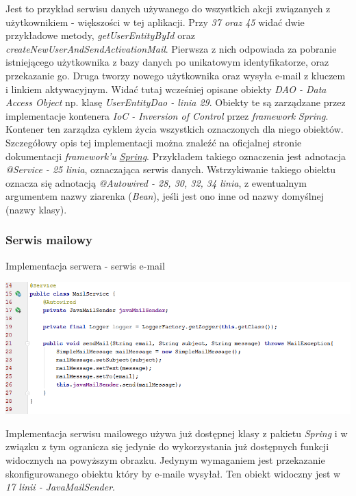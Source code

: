 \documentclass[10pt,titlepage]{article} %
\begin{document}
Jest to przykład serwisu danych używanego do wszystkich akcji związanych z użytkownikiem - większości w tej aplikacji. Przy \textit{37 oraz 45} widać dwie przykładowe metody, \textit{getUserEntityById} oraz \textit{createNewUserAndSendActivationMail}. Pierwsza z nich odpowiada za pobranie istniejącego użytkownika z bazy danych po unikatowym identyfikatorze, oraz przekazanie go. Druga tworzy nowego użytkownika oraz wysyła e-mail z kluczem i linkiem aktywacyjnym. Widać tutaj wcześniej opisane obiekty \textit{DAO - Data Access Object} np. klasę \textit{UserEntityDao - linia 29}. Obiekty te są zarządzane przez implementacje kontenera \textit{IoC - Inversion of Control} przez \textit{framework} \textit{Spring}. Kontener ten zarządza cyklem życia wszystkich oznaczonych dla niego obiektów. Szczegółowy opis tej implementacji można znaleźć na oficjalnej stronie dokumentacji \textit{framework'u} \href{https://docs.spring.io/spring/docs/current/spring-framework-reference/html/beans.html}{\textit{Spring}}\cite{ioc}. Przykładem takiego oznaczenia jest adnotacja \textit{@Service - 25 linia}, oznaczająca serwis danych. Wstrzykiwanie takiego obiektu oznacza się adnotacją \textit{@Autowired - 28, 30, 32, 34 linia}, z ewentualnym argumentem nazwy ziarenka (\textit{Bean}), jeśli jest ono inne od nazwy domyślnej (nazwy klasy).


\subsubsection{Serwis mailowy}

\begin{listing}[H]
\caption[Implementacja serwera - serwis e-mail]{Implementacja serwera - serwis e-mail}
\includegraphics[scale=0.7]{img/sekcja3/backend/serwisMailowy}
\end{listing}
Implementacja serwisu mailowego używa już dostępnej klasy z pakietu \textit{Spring} i w związku z tym ogranicza się jedynie do wykorzystania już dostępnych funkcji widocznych na powyższym obrazku. Jedynym wymaganiem jest przekazanie skonfigurowanego obiektu który by e-maile wysyłał. Ten obiekt widoczny jest w \textit{17 linii - JavaMailSender}.
\end{document}

